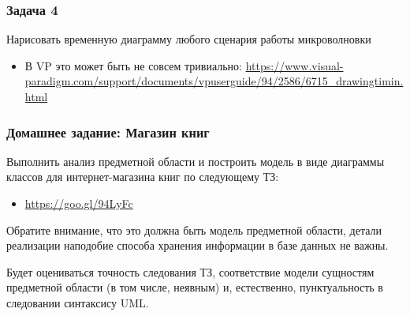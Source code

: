 \documentclass[xetex,mathserif,serif]{beamer}
\begin{document}
	\begin{frame}
		\frametitle{Задача 4}
		Нарисовать временную диаграмму любого сценария работы микроволновки
		\begin{itemize}
			\item В VP это может быть не совсем тривиально: \url{https://www.visual-paradigm.com/support/documents/vpuserguide/94/2586/6715_drawingtimin.html}
		\end{itemize}
	\end{frame}

	\begin{frame}
		\frametitle{Домашнее задание: Магазин книг}
		Выполнить анализ предметной области и построить модель в виде диаграммы классов для интернет-магазина книг по следующему ТЗ:
		\begin{itemize}
			\item \url{https://goo.gl/94LyFc}
		\end{itemize}

		Обратите внимание, что это должна быть модель предметной области, детали реализации наподобие способа хранения информации в базе данных не важны.

		Будет оцениваться точность следования ТЗ, соответствие модели сущностям предметной области (в том числе, неявным) и, естественно, пунктуальность в следовании синтаксису UML.
	\end{frame}
\end{document}
